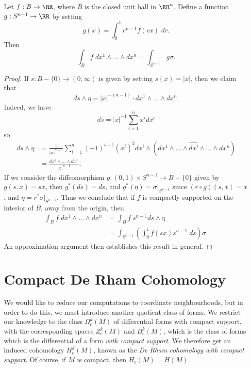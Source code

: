 \begin{theorem}
    Let $f: B \to \RR$, where $B$ is the closed unit ball in $\RR^n$. Define a function $g: S^{n-1} \to \RR$ by setting
    \[ g(x) = \int_0^1 r^{n-1} f(rx)\; dr. \]
    Then
    \[ \int_B f\; dx^1 \wedge \dots \wedge dx^n = \int_{S^{n-1}} g \sigma. \]
\end{theorem}
\begin{proof}
    If $s: B - \{ 0 \} \to (0,\infty)$ is given by setting $s(x) = |x|$, then we claim that
    \[ ds \wedge \eta = |x|^{-(n-1)} \cdot dx^1 \wedge \dots \wedge dx^n. \]
    Indeed, we have
    \[ ds = |x|^{-1} \sum_{i = 1}^n x^i dx^i \]
    so
    \begin{align*}
        ds \wedge \eta &= \frac{1}{|x|^{n+1}} \sum_{i = 1}^n (-1)^{i-1} (x^i)^2 dx^i \wedge (dx^1 \wedge \dots \wedge \widehat{dx^i} \wedge \dots \wedge dx^n)\\
        &= \frac{dx^1 \wedge \dots \wedge dx^n}{|x|^{n-1}}.
    \end{align*}
    If we consider the diffeomorphism $g: (0,1) \times S^{n-1} \to B - \{ 0 \}$ given by $g(s,x) = sx$, then $g^*(ds) = ds$, and $g^*(\eta) = \sigma|_{S^{n-1}}$ since $(r \circ g)(s,x) = x$, and $\eta = r^* \sigma|_{S^{n-1}}$. Thus we conclude that if $f$ is compactly supported on the interior of $B$, away from the origin, then
    \begin{align*}
        \int_B f\; dx^1 \wedge \dots \wedge dx^n &= \int_B f\; s^{n-1} ds \wedge \eta\\
        &= \int_{S^{n-1}} \left( \int_0^1 f(sx) s^{n-1}\; ds \right) \sigma.
    \end{align*}
    An approximation argument then establishes this result in general.
\end{proof}

\section{Compact De Rham Cohomology}

We would like to reduce our computations to coordinate neighbourhoods, but in order to do this, we must introduce another quotient class of forms. We restrict our knowledge to the class $\Omega^k_c(M)$ of differential forms with compact support, with the corresponding spaces $Z^k_c(M)$ and $B^k_c(M)$, which is the class of forms which is the differential of a form {\it with compact support}. We therefore get an induced cohomology $H^k_c(M)$, known as the \emph{De Rham cohomology with compact support}. Of course, if $M$ is compact, then $H_c(M) = H(M)$.

